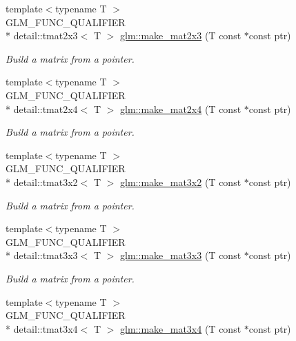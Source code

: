 \begin{DoxyCompactItemize}
{\footnotesize template$<$typename T $>$ }\\G\-L\-M\-\_\-\-F\-U\-N\-C\-\_\-\-Q\-U\-A\-L\-I\-F\-I\-E\-R \\*
detail\-::tmat2x3$<$ T $>$ \hyperlink{group__gtc__type__ptr_ga87d29f47fbd3990a344be2eac404aee3}{glm\-::make\-\_\-mat2x3} (T const $\ast$const ptr)
\begin{DoxyCompactList}\small\item\em Build a matrix from a pointer. \end{DoxyCompactList}\item 
{\footnotesize template$<$typename T $>$ }\\G\-L\-M\-\_\-\-F\-U\-N\-C\-\_\-\-Q\-U\-A\-L\-I\-F\-I\-E\-R \\*
detail\-::tmat2x4$<$ T $>$ \hyperlink{group__gtc__type__ptr_gaab3df4b27b38505f1413f507ebc43d18}{glm\-::make\-\_\-mat2x4} (T const $\ast$const ptr)
\begin{DoxyCompactList}\small\item\em Build a matrix from a pointer. \end{DoxyCompactList}\item 
{\footnotesize template$<$typename T $>$ }\\G\-L\-M\-\_\-\-F\-U\-N\-C\-\_\-\-Q\-U\-A\-L\-I\-F\-I\-E\-R \\*
detail\-::tmat3x2$<$ T $>$ \hyperlink{group__gtc__type__ptr_ga8764d696bd4dfb91d689ca196414b36b}{glm\-::make\-\_\-mat3x2} (T const $\ast$const ptr)
\begin{DoxyCompactList}\small\item\em Build a matrix from a pointer. \end{DoxyCompactList}\item 
{\footnotesize template$<$typename T $>$ }\\G\-L\-M\-\_\-\-F\-U\-N\-C\-\_\-\-Q\-U\-A\-L\-I\-F\-I\-E\-R \\*
detail\-::tmat3x3$<$ T $>$ \hyperlink{group__gtc__type__ptr_ga56ddd61c1c64dba464e392b2c2011226}{glm\-::make\-\_\-mat3x3} (T const $\ast$const ptr)
\begin{DoxyCompactList}\small\item\em Build a matrix from a pointer. \end{DoxyCompactList}\item 
{\footnotesize template$<$typename T $>$ }\\G\-L\-M\-\_\-\-F\-U\-N\-C\-\_\-\-Q\-U\-A\-L\-I\-F\-I\-E\-R \\*
detail\-::tmat3x4$<$ T $>$ \hyperlink{group__gtc__type__ptr_gaae2b48f5109461f13f63ccf5b4cde672}{glm\-::make\-\_\-mat3x4} (T const $\ast$const ptr)

\end{DoxyCompactItemize}

